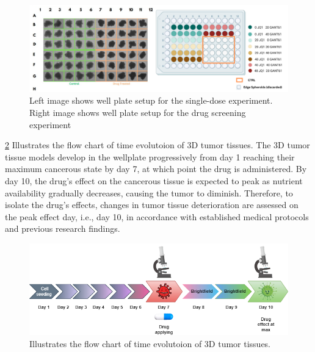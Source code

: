 \begin{figure}[H]
  \centering
  \includegraphics[width=0.9\linewidth]{figures/well.png} %
  \caption{Left image shows well plate setup for the single-dose experiment. Right image shows well plate setup for the drug screening experiment}
  \label{fig:wellplate setup}
\end{figure}



\ref{fig:time} Illustrates the flow chart of time evolutoion of 3D tumor tissues.
The 3D tumor tissue models develop in the wellplate progressively from day 1 reaching their maximum cancerous state by day 7, at which point the drug is 
administered. By day 10, the drug's effect on the cancerous tissue is expected to peak as nutrient availability gradually decreases, causing the tumor to 
diminish. Therefore, to isolate the drug's effects, changes in tumor tissue deterioration are assessed on the peak effect day, i.e., day 10, in 
accordance with established medical protocols and previous research findings.

\begin{figure}[H]
  \centering
  \includegraphics[scale=0.5]{figures/timed.png} 
  \caption{Illustrates the flow chart of time evolutoion of 3D tumor tissues.}
  \label{fig:time}
\end{figure}
\let\cleardoublepage\clearpage

